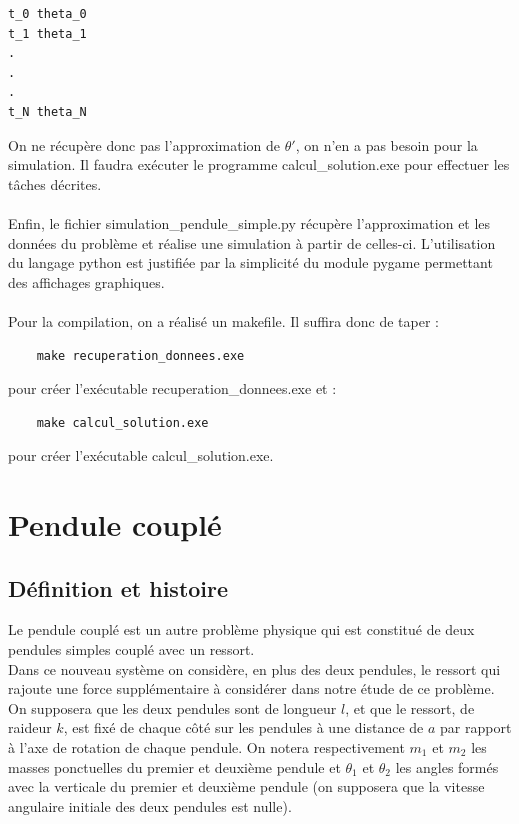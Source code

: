 \documentclass[9pt,a4paper]{article}
\begin{document}
\begin{Verbatim}
t_0 theta_0
t_1 theta_1
.
.
.
t_N theta_N
\end{Verbatim}
On ne récupère donc pas l'approximation de $\theta'$, on n'en a pas besoin pour la simulation. Il faudra exécuter le programme calcul\_solution.exe pour effectuer les tâches décrites.\\\\
Enfin, le fichier simulation\_pendule\_simple.py récupère l'approximation et les données du problème et réalise une simulation à partir de celles-ci. L'utilisation du langage python est justifiée par la simplicité du module pygame permettant des affichages graphiques.\\\\
Pour la compilation, on a réalisé un makefile. Il suffira donc de taper :
\begin{Verbatim}
    make recuperation_donnees.exe
\end{Verbatim}
pour créer l'exécutable recuperation\_donnees.exe et :
\begin{Verbatim}
    make calcul_solution.exe
\end{Verbatim}
pour créer l'exécutable calcul\_solution.exe.
\section{Pendule couplé}
\subsection{Définition et histoire}
Le pendule couplé est un autre problème physique qui est constitué de deux pendules simples couplé avec un ressort.\\
Dans ce nouveau système on considère, en plus des deux pendules, le ressort qui rajoute une force supplémentaire à considérer dans notre étude de ce problème.\\
On supposera que les deux pendules sont de longueur $l$, et que le ressort, de raideur $k$, est fixé de chaque côté sur les pendules à une distance de $a$ par rapport à l'axe de rotation de chaque pendule. On notera respectivement $m_1$ et $m_2$ les masses ponctuelles du premier et deuxième pendule et $\theta_1$ et $\theta_2$ les angles formés avec la verticale du premier et deuxième pendule (on supposera que la vitesse angulaire initiale des deux pendules est nulle).
\end{document}
